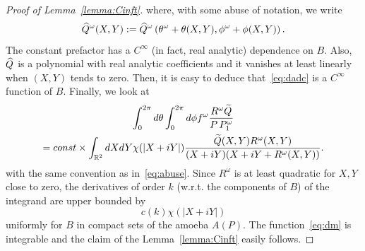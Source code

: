 \documentclass[AHL,Unicode,longabstracts,published]{cedram}
\newcommand{\bbR}{\mathbb{R}}
\let\oldtilde\tilde
\renewcommand*{\tilde}[1]{\mathchoice{\widetilde{#1}}{\widetilde{#1}}{\oldtilde{#1}}{\oldtilde{#1}}}
\let\oldhat\hat
\renewcommand*{\hat}[1]{\mathchoice{\widehat{#1}}{\widehat{#1}}{\oldhat{#1}}{\oldhat{#1}}}
\begin{document}
\begin{proof}[{Proof of Lemma~\ref{lemma:Cinft}}]
where, with some abuse of notation, we write
\begin{equation}\label{eq:abuse}
\hat Q^\omega(X,Y):=
\hat Q^\omega\left(\theta^\omega+\theta(X,Y),\phi^\omega+\phi(X,Y)\right).
\end{equation}
The constant prefactor has a $C^\infty$ (in fact, real analytic) dependence on $B$. Also, $\hat Q$ is a polynomial with real analytic coefficients and it vanishes at least linearly when $(X,Y)$ tends to zero. Then, it is easy to deduce that~\eqref{eq:dadc} is a $C^\infty$ function of $B$. Finally, we look at
\begin{multline}\label{eq:finally}
\int_0^{2\pi} d\theta \int_0^{2\pi}d\phi f^\omega \frac{R^\omega\tilde Q}{P\,P^\omega_1}\\
= const\times \int_{\bbR^2}dX dY \chi(|X+iY|)\frac{ \tilde Q (X,Y) R^\omega(X,Y)}{(X+i Y)(X+i Y+ R^\omega(X,Y))}.
\end{multline}
with the same convention as in~\eqref{eq:abuse}. Since $R^\omega$ is at least quadratic for $X,Y$ close to zero, the derivatives of order $k$ (w.r.t. the components of $B$) of the integrand are upper bounded by
\begin{equation}\label{eq:dm}
c(k)
\chi(|X+iY|)
\end{equation}
uniformly for $B$ in compact sets of the amoeba $A(P)$. The function~\eqref{eq:dm} is integrable and the claim of the Lemma~\ref{lemma:Cinft} easily follows.
\end{proof}
\end{document}
